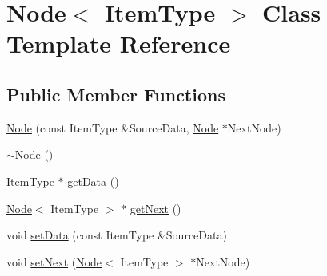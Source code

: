 \hypertarget{class_node}{\section{Node$<$ Item\-Type $>$ Class Template Reference}
\label{class_node}
}
\subsection*{Public Member Functions}
\begin{DoxyCompactItemize}
\item 
\hyperlink{class_node_ada3a08fbe1ad656eaef472d91cc943f5}{Node} (const Item\-Type \&Source\-Data, \hyperlink{class_node}{Node} $\ast$Next\-Node)
\item 
\hyperlink{class_node_a5ee87b6e5898ba7052687449d5a194f5}{$\sim$\-Node} ()
\item 
Item\-Type $\ast$ \hyperlink{class_node_ab6164e9e2550c8604baed322bd105ed3}{get\-Data} ()
\item 
\hyperlink{class_node}{Node}$<$ Item\-Type $>$ $\ast$ \hyperlink{class_node_a91da2ceedfbc1d99c332516864b57517}{get\-Next} ()
\item 
void \hyperlink{class_node_a551f50577009d0d8be33b8a917a7141d}{set\-Data} (const Item\-Type \&Source\-Data)
\item 
void \hyperlink{class_node_ae0616c2fba767ddcfef51b72bb3959e0}{set\-Next} (\hyperlink{class_node}{Node}$<$ Item\-Type $>$ $\ast$Next\-Node)
\end{DoxyCompactItemize}


